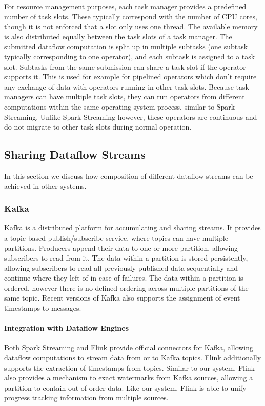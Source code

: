 For resource management purposes, each task manager provides
a predefined number of task slots. These typically correspond with the number of CPU cores,
though it is not enforced that a slot only uses one thread. The available memory is also distributed
equally between the task slots of a task manager. The submitted dataflow computation is split up
in multiple subtasks (one subtask typically corresponding to one operator), and each subtask is assigned
to a task slot. Subtasks from the same submission can share a task slot
if the operator supports it. This is used for example for pipelined operators which don't
require any exchange of data with operators running in other task slots.
Because task managers can have multiple task slots, they can run operators from different
computations within the same operating system process, similar to Spark Streaming.
Unlike Spark Streaming however, these operators are continuous and
do not migrate to other task slots during normal operation.

\subsection{Sharing Dataflow Streams}

In this section we discuss how composition of different dataflow streams 
can be achieved in other systems.

\subsubsection{Kafka}

Kafka \cite{kafka} is a distributed platform for accumulating and sharing streams. It provides
a topic-based publish/subscribe service, where topics can have multiple partitions. Producers append
their data to one or more partition, allowing subscribers to read from it.
The data within a partition is stored persistently, allowing subscribers to
read all previously published data sequentially and continue where they left
of in case of failures. The data within a partition is ordered, however there
is no defined ordering across multiple partitions of the same topic. Recent
versions of Kafka also supports the assignment of event timestamps to messages.

\paragraph{Integration with Dataflow Engines}

Both Spark Streaming and Flink provide official connectors for Kafka, allowing
dataflow computations to stream data from or to Kafka topics. Flink additionally supports
the extraction of timestamps from topics. Similar to our system, Flink also provides a
mechanism to exact watermarks from Kafka sources, allowing a partition
to contain out-of-order data. Like our system, Flink is able to unify
progress tracking information from multiple sources.


